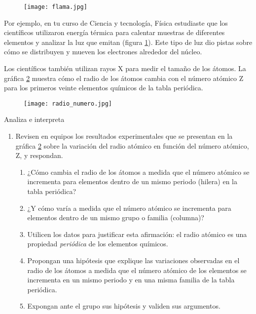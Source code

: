 \begin{figure}[H]
    \centering
    \texttt{[image: flama.jpg]}
    \label{fig:flama}
\end{figure}%

Por ejemplo, en tu curso de Ciencia y tecnología, Física estudiaste que los científicos utilizaron energía
térmica para calentar muestras de diferentes elementos y analizar la luz que emitan (figura \ref{fig:flama}).
Este tipo de luz dio pistas sobre cómo se distribuyen y mueven los electrones alrededor del núcleo.



Los científicos también utilizan rayos X para medir el tamaño de los átomos.
La gráfica \ref{fig:radio_numero} muestra cómo el radio de los átomos cambia con el número atómico Z para los
primeros veinte elementos químicos de la tabla periódica.

\begin{figure}[H]
    \centering
    \texttt{[image: radio\_numero.jpg]}
    \label{fig:radio_numero}
\end{figure}%

\begin{boxF}
    Analiza e interpreta
    \begin{enumerate}
        \item Revisen en equipos los resultados experimentales que se presentan en la gráfica \ref{fig:radio_numero} sobre la variación del radio atómico en función del número atómico, Z, y respondan.
              \begin{enumerate}
                  \item ¿Cómo cambia el radio de los átomos a medida que el número atómico se incrementa para elementos dentro de un mismo periodo (hilera) en la tabla periódica?
                  \item ¿Y cómo varía a medida que el número atómico se incrementa para elementos dentro de un mismo grupo o familia (columna)?
                  \item Utilicen los datos para justificar esta afirmación: el radio atómico es una propiedad \emph{periódica} de los elementos químicos.
                  \item Propongan una hipótesis que explique las variaciones observadas en el radio de los átomos a medida que el número atómico de los elementos se incrementa en un mismo periodo y en una misma familia de la tabla periódica.
                  \item Expongan ante el grupo sus hipótesis y validen sus argumentos.
              \end{enumerate}

    \end{enumerate}
\end{boxF}

